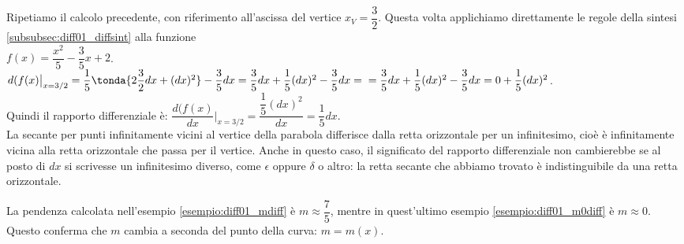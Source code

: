 \begin{esempio}
 \label{esempio:diff01_m0diff}
 Ripetiamo il calcolo precedente, con riferimento all'ascissa del vertice 
 $x_V=\dfrac{3}{2}$. Questa volta applichiamo direttamente le regole della 
sintesi 
 \ref{subsubsec:diff01_diffsint} alla funzione\\ 
$f(x)=\dfrac{x^2}{5}-\dfrac{3}{5}x+2$.\\
 $d(f(x)\big|_{x=3/2}=
  \dfrac{1}{5}\tonda{2\dfrac{3}{2} dx+(dx)^2}-\dfrac{3}{5}dx=
  \dfrac{3}{5}dx+\dfrac{1}{5}(dx)^2-\dfrac{3}{5}dx=\\
  =\dfrac{3}{5}dx+\dfrac{1}{5}(dx)^2-\dfrac{3}{5}dx=0+\dfrac{1}{5}(dx)^2$.\\
 Quindi il rapporto differenziale è: 
 $\dfrac{d(f(x)}{dx}\bigg|_{x=3/2}=\dfrac{\dfrac{1}{5}(dx)^2}{dx}
 =\dfrac{1}{5}dx$.\\
 La secante per punti infinitamente vicini al vertice della parabola
 differisce dalla retta orizzontale per un infinitesimo, cioè è
 infinitamente vicina alla retta orizzontale che passa per il vertice.
 Anche in questo caso, il significato del rapporto differenziale non cambierebbe
 se al posto di \(dx\) si scrivesse un infinitesimo diverso, come \(\epsilon\) 
 oppure \(\delta\) o altro: la retta secante che abbiamo trovato è 
indistinguibile da una retta orizzontale.
 \end{esempio}

\begin{osservazione}
La pendenza calcolata nell'esempio \ref{esempio:diff01_mdiff} è 
$m\approx\dfrac{7}{5}$, mentre in quest'ultimo esempio 
\ref{esempio:diff01_m0diff} è
$m\approx 0$. Questo conferma che $m$ cambia a seconda del punto della 
curva: $m=m(x)$.
\end{osservazione}

